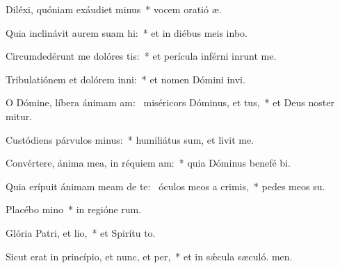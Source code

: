\item Diléxi, quóniam exáudiet minus~* vocem oratió æ.
\item Quia inclinávit aurem suam hi:~* et in diébus meis inbo.
\item Circumdedérunt me dolóres tis:~* et perícula inférni inrunt me.
\item Tribulatiónem et dolórem inni:~* et nomen Dómini invi.
\item O Dómine, líbera ánimam am:~\pscross{} miséricors Dóminus, et tus,~* et Deus noster mitur.
\item Custódiens párvulos minus:~* humiliátus sum, et livit me.
\item Convértere, ánima mea, in réquiem am:~* quia Dóminus benefé bi.
\item Quia erípuit ánimam meam de te:~\pscross{} óculos meos a crimis,~* pedes meos  su.
\item Placébo mino~* in regióne rum.
\item Glória Patri, et lio,~* et Spirítu to.
\item Sicut erat in princípio, et nunc, et per,~* et in sǽcula sæculó. men.
